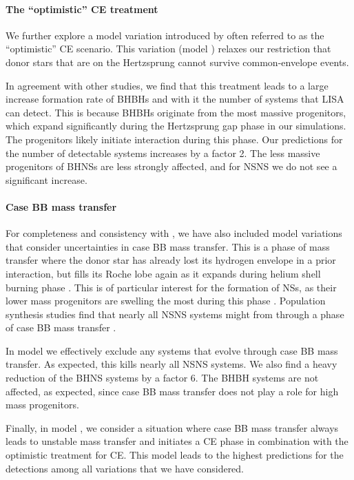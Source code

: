 \paragraph{The ``optimistic'' CE treatment} We further explore a model variation introduced by \citet{Belczynski+2007} often referred to as the ``optimistic'' CE scenario. This variation (model \modOpt{}) relaxes our restriction that donor stars that are on the Hertzsprung cannot survive common-envelope events.

In agreement with other studies, we find that this treatment leads to a large increase formation rate of BHBHs and with it the number of systems that LISA can detect. This is because BHBHs originate from the most massive progenitors, which expand significantly during the Hertzsprung gap phase in our simulations. The progenitors likely initiate interaction during this phase. Our predictions for the number of detectable systems increases by a factor 2. The less massive progenitors of BHNSs are less strongly affected, and for NSNS we do not see a significant increase. 

\paragraph{Case BB mass transfer} For completeness and consistency with \citet{Broekgaarden+2021}, we have also included model variations that consider uncertainties in case BB mass transfer. This is a phase of mass transfer where the donor star has already lost its hydrogen envelope in a prior interaction, but fills its Roche lobe again as it expands during helium shell burning phase \citep[e.g.][]{Dewi+2003, Vigna-Gomez+2018}. This is of particular interest for the formation of NSs, as their lower mass progenitors are swelling the most during this phase \citep[e.g.][and references therein]{Laplace+2020}. Population synthesis studies find that nearly all NSNS systems might from through a phase of case BB mass transfer \citep{Vigna-Gomez+2018}.

In model \modCaseBB{} we effectively exclude any systems that evolve through case BB mass transfer. As expected, this kills nearly all NSNS systems. We also find a heavy reduction of the BHNS systems by a factor 6. The BHBH systems are not affected, as expected, since case BB mass transfer does not play a role for high mass progenitors.

Finally, in model \modCaseBBOpt{}, we consider a situation where case BB mass transfer always leads to unstable mass transfer and initiates a CE phase in combination with the optimistic treatment for CE. This model leads to the highest predictions for the detections among all variations that we have considered.


